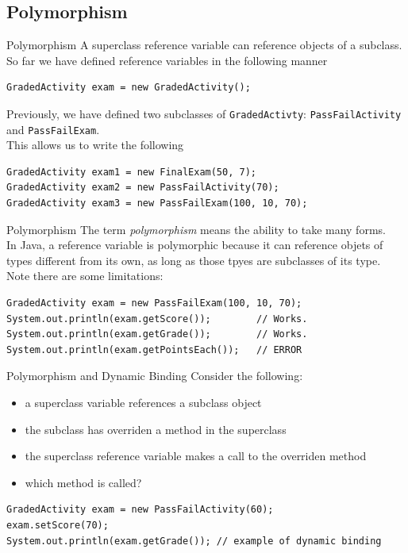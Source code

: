 \documentclass[11pt]{beamer}
\begin{document}
\subsection{Polymorphism}
\begin{frame}[fragile]{Polymorphism}
    A superclass reference variable can reference objects of a subclass. \\ \vspace{1em}
    So far we have defined reference variables in the following manner
    \begin{lstlisting}
GradedActivity exam = new GradedActivity();
    \end{lstlisting}
    Previously, we have defined two subclasses of \texttt{GradedActivty}: \texttt{PassFailActivity} and \texttt{PassFailExam}. \\ \vspace{1em}
    This allows us to write the following
    \begin{lstlisting}
GradedActivity exam1 = new FinalExam(50, 7);
GradedActivity exam2 = new PassFailActivity(70);
GradedActivity exam3 = new PassFailExam(100, 10, 70);
    \end{lstlisting}
\end{frame}

\begin{frame}[fragile]{Polymorphism}
    The term \textit{polymorphism} means the ability to take many forms. \\ \vspace{1em}
    In Java, a reference variable is polymorphic because it can reference objets of types different from its own, as long as those tpyes are subclasses of its type. \\ \vspace{1em}
    Note there are some limitations:
    \begin{lstlisting}
GradedActivity exam = new PassFailExam(100, 10, 70);
System.out.println(exam.getScore());        // Works.
System.out.println(exam.getGrade());        // Works.
System.out.println(exam.getPointsEach());   // ERROR
    \end{lstlisting}
\end{frame}

\begin{frame}[fragile]{Polymorphism and Dynamic Binding}
    Consider the following:
    \begin{itemize}
        \item a superclass variable references a subclass object
        \item the subclass has overriden a method in the superclass
        \item the superclass reference variable makes a call to the overriden method
        \item which method is called?
    \end{itemize}
    \begin{lstlisting}
GradedActivity exam = new PassFailActivity(60);
exam.setScore(70);
System.out.println(exam.getGrade()); // example of dynamic binding
    \end{lstlisting}
\end{frame}
\end{document}
